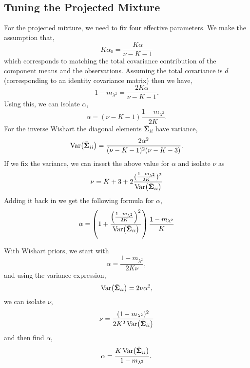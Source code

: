 \documentclass{article}
\newcommand{\compcov}{\bar{\bm{\Sigma}}}
\newcommand{\noisescalesq}{\lambda^2}
\begin{document}
\subsection{Tuning the Projected Mixture}
For the projected mixture, we need to fix four effective parameters. We make the assumption that,
\begin{equation}
K\alpha_0=\frac{K\alpha}{\nu-K-1}
\end{equation}
which corresponds to matching the total covariance contribution of the component means and the observations. Assuming the total covariance is $d$ (corresponding to an identity covariance matrix) then we have,
\begin{equation}
1-m_{\noisescalesq}=\frac{2K\alpha}{\nu-K-1}.
\end{equation}
Using this, we can isolate $\alpha$,
\begin{equation}
\alpha=(\nu-K-1)\frac{1-m_{\noisescalesq}}{2K}.
\end{equation}
For the inverse Wishart the diagonal elements $\compcov_{ii}$ have variance,
\begin{equation}
\Var{\compcov_{ii}}=\frac{2\alpha^2}{(\nu-K-1)^2(\nu-K-3)}.
\end{equation}
If we fix the variance, we can insert the above value for $\alpha$ and isolate $\nu$ as
\begin{equation}
\nu=K+3+2\frac{(\frac{1-m_{\noisescalesq}}{2K})^2}{\Var{\compcov_{ii}}}
\end{equation}
Adding it back in we get the following formula for $\alpha$,
\begin{equation}
\alpha=\left(1+\frac{\left(\frac{1-m_{\noisescalesq}}{2K}\right)^2}{\Var{\compcov_{ii}}}\right)\frac{1-m_{\noisescalesq}}{K}
\end{equation}

With Wishart priors, we start with
\begin{equation}
\alpha=\frac{1-m_{\noisescalesq}}{2K\nu},
\end{equation}
and using the variance expression,
\begin{equation}
\Var{\compcov_{ii}}=2\nu\alpha^2,
\end{equation}
we can isolate $\nu$,
\begin{equation}
\nu=\frac{(1-m_{\noisescalesq})^2}{2K^2\Var{\compcov_{ii}}}
\end{equation}
and then find $\alpha$,
\begin{equation}
\alpha=\frac{K\Var{\compcov_{ii}}}{1-m_{\noisescalesq}}.
\end{equation}
\end{document}
